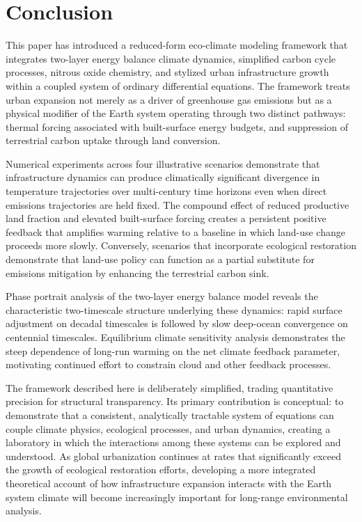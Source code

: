 \documentclass[12pt]{article}
\begin{document}
\section{Conclusion}
\label{sec:conclusion}

This paper has introduced a reduced-form eco-climate modeling framework that
integrates two-layer energy balance climate dynamics, simplified carbon cycle
processes, nitrous oxide chemistry, and stylized urban infrastructure growth
within a coupled system of ordinary differential equations.  The framework treats
urban expansion not merely as a driver of greenhouse gas emissions but as a
physical modifier of the Earth system operating through two distinct pathways:
thermal forcing associated with built-surface energy budgets, and suppression of
terrestrial carbon uptake through land conversion.

Numerical experiments across four illustrative scenarios demonstrate that
infrastructure dynamics can produce climatically significant divergence in
temperature trajectories over multi-century time horizons even when direct
emissions trajectories are held fixed.  The compound effect of reduced productive
land fraction and elevated built-surface forcing creates a persistent positive
feedback that amplifies warming relative to a baseline in which land-use change
proceeds more slowly.  Conversely, scenarios that incorporate ecological
restoration demonstrate that land-use policy can function as a partial
substitute for emissions mitigation by enhancing the terrestrial carbon sink.

Phase portrait analysis of the two-layer energy balance model reveals the
characteristic two-timescale structure underlying these dynamics: rapid surface
adjustment on decadal timescales is followed by slow deep-ocean convergence on
centennial timescales.  Equilibrium climate sensitivity analysis demonstrates the
steep dependence of long-run warming on the net climate feedback parameter,
motivating continued effort to constrain cloud and other feedback processes.

The framework described here is deliberately simplified, trading quantitative
precision for structural transparency.  Its primary contribution is conceptual:
to demonstrate that a consistent, analytically tractable system of equations can
couple climate physics, ecological processes, and urban dynamics, creating a
laboratory in which the interactions among these systems can be explored and
understood.  As global urbanization continues at rates that significantly exceed
the growth of ecological restoration efforts, developing a more integrated
theoretical account of how infrastructure expansion interacts with the Earth
system climate will become increasingly important for long-range environmental
analysis.

\newpage


\end{document}
